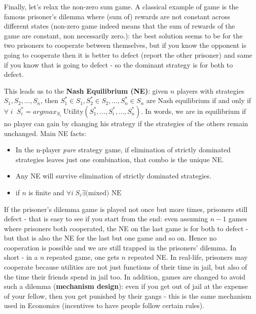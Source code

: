 \documentclass[11pt]{article}
\newtheorem{theorem}{Theorem}[section]
\begin{document}
Finally, let's relax the non-zero sum game. A classical example of game is the famous prisoner's dilemma where (sum of) rewards are not constant across different states (non-zero game indeed means that the sum of rewards of the game are constant, non necessarily zero.): the best solution seems to be for the two prisoners to cooperate between themselves, but if you know the opponent is going to cooperate then it is better to defect (report the other prisoner) and same if you know that is going to defect - so the dominant strategy is for both to defect. 

This leads us to the \textbf{Nash Equilibrium (NE)}: 
given $n$ players with strategies $S_1, S_2, \ldots, S_n$, then 
$S^*_1 \in S_1, S^*_2 \in S_2, \ldots, S^*_n \in S_n$ are Nash equilibrium if and only if $\forall \; i \;\; S^*_i=argmax_{S_i} \; \text{Utility}(S^*_1, \ldots,S^*_i, \ldots, S^*_n)$.
In words, we are in equilibrium if no player can gain by changing his strategy if the strategies of the others remain unchanged. Main NE facts:
\begin{itemize}
	\item In the n-player \textit{pure} strategy game, if elimination of strictly dominated strategies leaves just one combination, that combo is the unique NE.
	\item Any NE will survive elimination of strictly dominated strategies.
	\item if $n$ is finite and $\forall i \; S_i \exists \text{(mixed) NE}$
\end{itemize}

If the prisoner's dilemma game is played not once but more times, prisoners still defect - that is easy to see if you start from the end: even assuming $n-1$ games where prisoners both cooperated, the NE on the last game is for both to defect - but that is also the NE for the last but one game and so on. Hence no cooperation is possible and we are still trapped in the prisoners' dilemma. In short - in a $n$ repeated game, one gets $n$ repeated NE. In real-life, prisoners may cooperate because utilities are not just functions of their time in jail, but also of the time their friends spend in jail too. In addition, games are changed to avoid such a dilemma (\textbf{mechanism design}): even if you get out of jail at the expense of your fellow, then you get punished by their gangs - this is the same mechanism used in Economics (incentives to have people follow certain rules).
\end{document}
